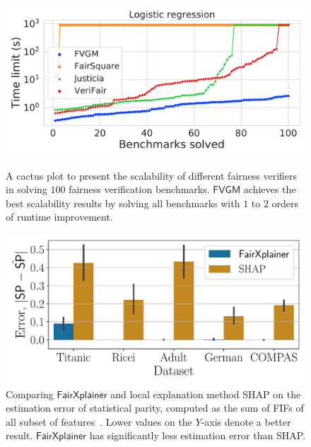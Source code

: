 \documentclass{article}
\begin{document}
	
	
	\begin{figure}
		\begin{minipage}{0.47\textwidth}
			\centering\begin{center}		
			\includegraphics[scale=0.3]{figures/cactus_all_verifiers_LR_time_}
			\end{center}
			\caption{A cactus plot to present the scalability of different fairness verifiers in solving $ 100 $ fairness verification benchmarks. $ \mathsf{FVGM} $ achieves the best scalability results by solving all benchmarks with $ 1 $ to $ 2 $ orders of runtime improvement.} \label{fig:scalability_exp}
		\end{minipage}\hfill
		\begin{minipage}{0.48\textwidth}
			\centering
			\includegraphics[scale=0.4]{figures/sp_train_accuracy}
			\caption{Comparing $ \mathsf{FairXplainer} $ and local explanation method SHAP on the estimation error of statistical parity, computed as the sum of FIFs of all subset of features~\cite{ghosh2022how}. Lower values on the $ Y $-axis denote a better result. $ \mathsf{FairXplainer} $ has significantly less estimation error than SHAP.}\label{fig:estimation_error}
		\end{minipage}
	\end{figure}
	
\end{document}
